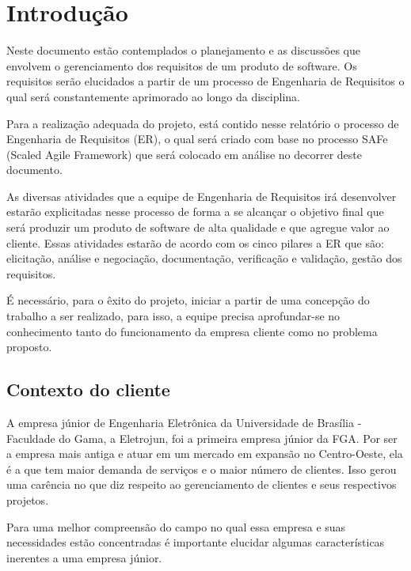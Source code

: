 \chapter[Introdução]{Introdução}

Neste documento estão contemplados o planejamento e as discussões que envolvem o gerenciamento dos requisitos de um produto de software. Os requisitos serão elucidados a partir de um processo de Engenharia de Requisitos o qual será constantemente aprimorado ao longo da disciplina.

Para a realização adequada do projeto, está contido nesse relatório o processo de Engenharia de Requisitos (ER), o qual será criado com base no processo SAFe (Scaled Agile Framework) que será colocado em análise no decorrer deste documento.

As diversas atividades que a equipe de Engenharia de Requisitos irá desenvolver estarão explicitadas nesse processo de forma a se alcançar o objetivo final que será produzir um produto de software de alta qualidade e que agregue valor ao cliente. Essas atividades estarão de acordo com os cinco pilares a ER que são: elicitação, análise e negociação, documentação, verificação e validação, gestão dos requisitos.

É necessário, para o êxito do projeto, iniciar a partir de uma concepção do trabalho a ser realizado, para isso, a equipe precisa aprofundar-se no conhecimento tanto do funcionamento da empresa cliente como no problema proposto.

  \section{Contexto do cliente}
A empresa júnior de Engenharia Eletrônica da Universidade de Brasília - Faculdade do Gama, a Eletrojun, foi a primeira empresa júnior da FGA. Por ser a empresa mais antiga e atuar em um mercado em expansão no Centro-Oeste, ela é a que tem maior demanda de serviços e o maior número de clientes. Isso gerou uma carência no que diz respeito ao gerenciamento de clientes e seus respectivos projetos.

Para uma melhor compreensão do campo no qual essa empresa e suas necessidades estão concentradas é importante elucidar algumas características inerentes a uma empresa júnior.

